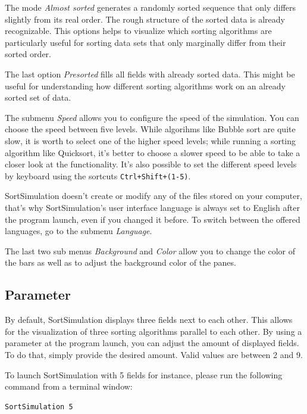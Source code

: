 \documentclass[]{pfBook}
\begin{document}
	The mode \emph{Almost sorted} generates a randomly sorted sequence that only differs slightly from its real order. The rough structure of the sorted data is already recognizable. This options helps to visualize which sorting algorithms are particularly useful for sorting data sets that only marginally differ from their sorted order.
	
	The last option \emph{Presorted} fills all fields with already sorted data. This might be useful for understanding how different sorting algorithms work on an already sorted set of data.
	
	The submenu \emph{Speed} allows you to configure the speed of the simulation. You can choose the speed between five levels. While algorihms like Bubble sort are quite slow, it is worth to select one of the higher speed levels; while running a sorting algorithm like Quicksort, it's better to choose a slower speed to be able to take a closer look at the functionality. It's also possible to set the different speed levels by keyboard using the sortcuts \texttt{Ctrl+Shift+(1-5)}.
	
	SortSimulation doesn't create or modify any of the files stored on your computer, that's why SortSimulation's user interface language is always set to English after the program launch, even if you changed it before. To switch between the offered languages, go to the submenu \emph{Language}.
	
	The last two sub menus \emph{Background} and \emph{Color} allow you to change the color of the bars as well as to adjust the background color of the panes.
	
	\subsection{Parameter}
	\label{StartUpArguments}
	
	By default, SortSimulation displays three fields next to each other. This allows for the visualization of three sorting algorithms parallel to each other. By using a parameter at the program launch, you can adjust the amount of displayed fields. To do that, simply provide the desired amount. Valid values are between 2 and 9.
	
	To launch SortSimulation with 5 fields for instance, please run the following command from a terminal window:
	
	\begin{lstlisting}[style=shell]
SortSimulation 5
	\end{lstlisting}
	
\end{document}
